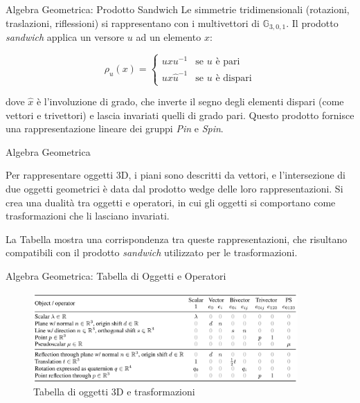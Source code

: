 \begin{frame}{Algebra Geometrica: Prodotto Sandwich}
    Le simmetrie tridimensionali (rotazioni, traslazioni, riflessioni) si rappresentano 
    con i multivettori di \( \mathbb{G}_{3,0,1} \). Il prodotto \textit{sandwich} applica 
    un versore \( u \) ad un elemento \( x \):

    \[
        \rho_u(x) = 
        \begin{cases}
            u x u^{-1} & \text{se } u \text{ è pari} \\
            u x \hat{u}^{-1} & \text{se } u \text{ è dispari}
        \end{cases}
    \]

    dove \( \hat{x} \) è l'involuzione di grado, che inverte il segno degli elementi 
    dispari (come vettori e trivettori) e lascia invariati quelli di grado pari. 
    Questo prodotto fornisce una rappresentazione lineare dei gruppi \textit{Pin} e 
    \textit{Spin}.

\end{frame}

\begin{frame}{Algebra Geometrica}

    Per rappresentare oggetti 3D, i piani sono descritti da vettori, e l'intersezione 
    di due oggetti geometrici è data dal prodotto wedge delle loro rappresentazioni. 
    Si crea una dualità tra oggetti e operatori, in cui gli oggetti 
    si comportano come trasformazioni che li lasciano invariati.

    La Tabella mostra una corrispondenza tra queste rappresentazioni, che risultano 
    compatibili con il prodotto \textit{sandwich} utilizzato per le trasformazioni.

\end{frame}

\begin{frame}{Algebra Geometrica: Tabella di Oggetti e Operatori}
    \begin{figure}
        \centering
        \includegraphics[width=0.9\textwidth]{../Images/relazioneOggettiOperatori.png}
        \caption{Tabella di oggetti 3D e trasformazioni}
    \end{figure}
\end{frame}

